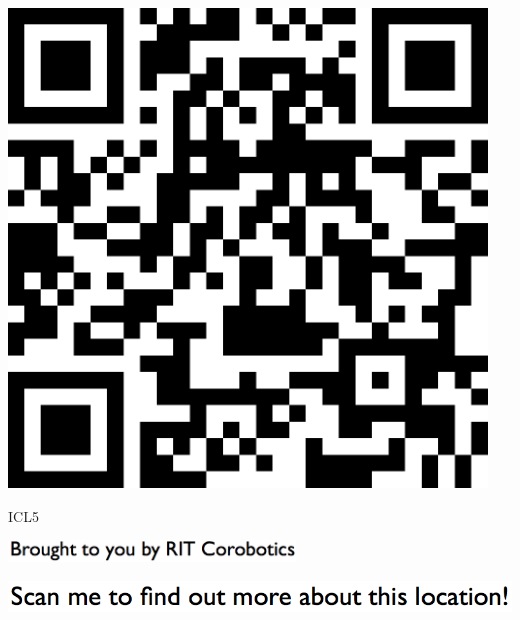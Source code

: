 \documentclass[letterpaper]{article}
\begin{document}
 \begingroup 
 \centerline{\includegraphics[scale=1,width=5in,height=5in]{ICL5.png}} 
 \endgroup 
 \vspace*{\fill} 

 \hfill{\small ICL5} 

  \vspace{0.7in} 
 
 \centerline{\includegraphics[scale=1,width=3in]{text-bottom.png}} 
 
 \pagebreak 
{} 
 \vspace*{\fill} 
 
  \centerline{\includegraphics[scale=1,width=6in]{text-top.png}} 
 
 \vspace{0.5in} 
 
\end{document}
